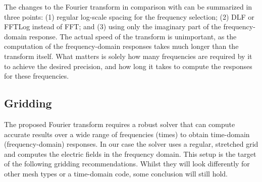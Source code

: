 \documentclass[extra, camera,%
]{gji}
\begin{document}
The changes to the Fourier transform in comparison with \cite{GEO.08.Mulder}
can be summarized in three points: (1) regular log-scale spacing for the
frequency selection; (2) DLF or FFTLog instead of FFT; and (3) using only the
imaginary part of the frequency-domain response. The actual speed of the
transform is unimportant, as the computation of the frequency-domain responses
takes much longer than the transform itself. What matters is solely how many
frequencies are required by it to achieve the desired precision, and how long
it takes to compute the responses for these frequencies.

\subsection{Gridding}   %

The proposed Fourier transform requires a robust solver that can compute
accurate results over a wide range of frequencies (times) to obtain time-domain
(frequency-domain) responses. In our case the solver uses a regular, stretched
grid and computes the electric fields in the frequency domain. This setup is
the target of the following gridding recommendations. Whilst they will look
differently for other mesh types or a time-domain code, some conclusion will
still hold.
\end{document}

